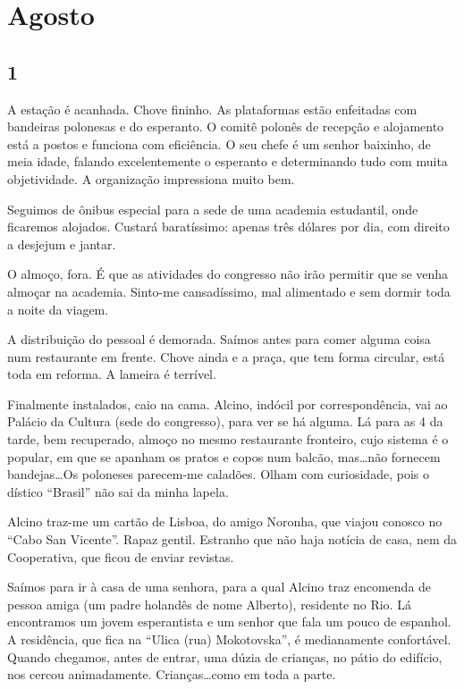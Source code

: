\chapter{Agosto}
\section*{1 \adfflatleafright {}}
A estação é acanhada. Chove fininho. As plataformas estão enfeitadas com bandeiras polonesas e do esperanto. O comitê polonês de recepção e alojamento está a postos e funciona com eficiência. O seu chefe é um senhor baixinho, de meia idade, falando excelentemente o esperanto e determinando tudo com muita objetividade. A organização impressiona muito bem.

Seguimos de ônibus especial para a sede de uma academia estudantil, onde ficaremos alojados. Custará baratíssimo: apenas três dólares por dia, com direito a desjejum e jantar.

O almoço, fora. É que as atividades do congresso não irão permitir que se venha almoçar na academia. Sinto-me cansadíssimo, mal alimentado e sem dormir toda a noite da viagem.

A distribuição do pessoal é demorada. Saímos antes para comer alguma coisa num restaurante em frente. Chove ainda e a praça, que tem forma circular, está toda em reforma. A lameira é terrível.

Finalmente instalados, caio na cama. Alcino, indócil por correspondência, vai ao Palácio da Cultura (sede do congresso), para ver se há alguma. Lá para as 4 da tarde, bem recuperado, almoço no mesmo restaurante fronteiro, cujo sistema é o popular, em que se apanham os pratos e copos num balcão, mas\ldots não fornecem bandejas\ldots Os poloneses parecem-me caladões. Olham com curiosidade, pois o dístico “Brasil” não sai da minha lapela.

Alcino traz-me um cartão de Lisboa, do amigo Noronha, que viajou conosco no “Cabo San Vicente”. Rapaz gentil. Estranho que não haja notícia de casa, nem da Cooperativa, que ficou de enviar revistas.

Saímos para ir à casa de uma senhora, para a qual Alcino traz encomenda de pessoa amiga (um padre holandês de nome Alberto), residente no Rio. Lá encontramos um jovem esperantista e um senhor que fala um pouco de espanhol. A residência, que fica na “Ulica (rua) Mokotovska”, é medianamente confortável. Quando chegamos, antes de entrar, uma dúzia de crianças, no pátio do edifício, nos cercou animadamente. Crianças\ldots como em toda a parte.

